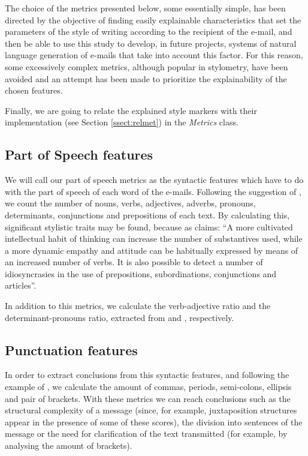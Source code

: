 The choice of the metrics presented below, some essentially simple, has been directed by the objective of finding easily explainable characteristics that set the parameters of the style of writing according to the recipient of the e-mail, and then be able to use this study to develop, in future projects, systems of natural language generation of e-mails that take into account this factor. For this reason, some excessively complex metrics, although popular in stylometry, have been avoided and an attempt has been made to prioritize the explainability of the chosen features.

Finally, we are going to relate the explained style markers with their implementation (see Section \ref{ssect:relmet}) in the \textit{Metrics} class.

\subsection{Part of Speech features}\label{ssect:posf}

We will call our part of speech metrics as the syntactic features which have to do with the part of speech of each word of the e-mails. Following the suggestion of \cite{holmes1985analysis}, we count the number of nouns, verbs, adjectives, adverbs, pronouns, determinants, conjunctions and prepositions of each text. By calculating this, significant stylistic traits may be found, because as \cite{somers1966statistical} claims: ``A more cultivated intellectual habit of thinking can increase the number of substantives used, while a more dynamic empathy and attitude can be habitually expressed by means of an increased number of verbs. It is also possible to detect a number of idiosyncrasies in the use of prepositions, subordinations, conjunctions and articles''.

In addition to this metrics, we calculate the verb-adjective ratio and the determinant-pronouns ratio, extracted from \cite{antosch1969diagnosis} and \cite{brainerd1974weighting}, respectively.

\subsection{Punctuation features}\label{ssect:punctf}

In order to extract conclusions from this syntactic features, and following the example of \cite{calix2008stylometry}, we calculate the amount of commas, periods, semi-colons, ellipsis and pair of brackets. With these metrics we can reach conclusions such as the structural complexity of a message (since, for example, juxtaposition structures appear in the presence of some of these scores), the division into sentences of the message or the need for clarification of the text transmitted (for example, by analysing the amount of brackets).

